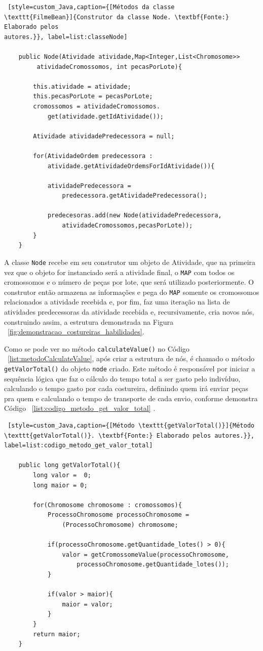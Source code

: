 \begin{lstlisting} [style=custom_Java,caption={[Métodos da classe
\texttt{FilmeBean}]{Construtor da classe Node. \textbf{Fonte:} Elaborado pelos
autores.}}, label=list:classeNode]

	public Node(Atividade atividade,Map<Integer,List<Chromosome>>
		 atividadeCromossomos, int pecasPorLote){
		
		this.atividade = atividade;
		this.pecasPorLote = pecasPorLote;
		cromossomos = atividadeCromossomos.
			get(atividade.getIdAtividade());
			
		Atividade atividadePredecessora = null;
		
		for(AtividadeOrdem predecessora : 
			atividade.getAtividadeOrdemsForIdAtividade()){
			
			atividadePredecessora = 
				predecessora.getAtividadePredecessora();
		
			predecesoras.add(new Node(atividadePredecessora,
				atividadeCromossomos,pecasPorLote));
		}
	}
\end{lstlisting}

\par A classe \texttt{Node} recebe em seu construtor um objeto de Atividade, que na primeira vez que o objeto for instanciado
será a atividade final, o \texttt{MAP} com todos os cromossomos e o número de peças por lote, que será utilizado posteriormente.
O construtor então armazena as informações e pega do \texttt{MAP} somente os cromossomos relacionados a atividade recebida e, 
por fim, faz uma iteração na lista de atividades predecessoras da atividade recebida e, recursivamente, cria novos nós, 
construindo assim, a estrutura demonstrada na Figura
~\ref{fig:demonstracao_costureiras_habilidades}.

\par Como se pode ver no método \texttt{calculateValue()} no Código
~\ref{list:metodoCalculateValue}, após criar a estrutura de nós, é chamado o método \texttt{getValorTotal()} do objeto
\texttt{node} criado. Este método é responsável por iniciar a sequência lógica que 
faz o cálculo do tempo total a ser gasto pelo indivíduo, calculando o tempo gasto por 
cada costureira, definindo quem irá enviar peças pra quem e calculando o tempo de transporte 
de cada envio, conforme demonstra Código ~\ref{list:codigo_metodo_get_valor_total} .

\begin{lstlisting} [style=custom_Java,caption={[Método \texttt{getValorTotal()}]{Método \texttt{getValorTotal()}. \textbf{Fonte:} Elaborado pelos autores.}}, label=list:codigo_metodo_get_valor_total] 	

	public long getValorTotal(){
		long valor =  0;
		long maior = 0;
		
		for(Chromosome chromosome : cromossomos){
			ProcessoChromosome processoChromosome = 
				(ProcessoChromosome) chromosome;
		
			if(processoChromosome.getQuantidade_lotes() > 0){
				valor = getCromossomeValue(processoChromosome,
					processoChromosome.getQuantidade_lotes());
			}
	
			if(valor > maior){
				maior = valor;
			}
		}
		return maior;
	}

\end{lstlisting}


